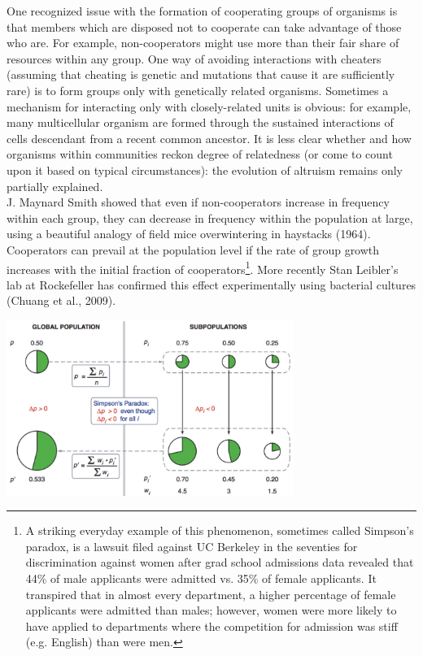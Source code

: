 \documentclass{article}
\begin{document}
One recognized issue with the formation of cooperating groups of organisms is that members which are disposed not to cooperate can take advantage of those who are. For example, non-cooperators might use more than their fair share of resources within any group. One way of avoiding interactions with cheaters (assuming that cheating is genetic and mutations that cause it are sufficiently rare) is to form groups only with genetically related organisms. Sometimes a mechanism for interacting only with closely-related units is obvious: for example, many multicellular organism are formed through the sustained interactions of cells descendant from a recent common ancestor. It is less clear whether and how organisms within communities reckon degree of relatedness (or come to count upon it based on typical circumstances): the evolution of altruism remains only partially explained.\\

J. Maynard Smith showed that even if non-cooperators increase in frequency within each group, they can decrease in frequency within the population at large, using a beautiful analogy of field mice overwintering in haystacks (1964). Cooperators can prevail at the population level if the rate of group growth increases with the initial fraction of cooperators\footnote{A striking everyday example of this phenomenon, sometimes called Simpson's paradox, is a lawsuit filed against UC Berkeley in the seventies for discrimination against women after grad school admissions data revealed that 44\% of male applicants were admitted vs. 35\% of female applicants. It transpired that in almost every department, a higher percentage of female applicants were admitted than males; however, women were more likely to have applied to departments where the competition for admission was stiff (e.g. English) than were men.}. More recently Stan Leibler's lab at Rockefeller has confirmed this effect experimentally using bacterial cultures (Chuang et al., 2009).

\begin{center}
\includegraphics[width=0.7\textwidth]{chuang_fig.pdf}
\end{center}
\end{document}
